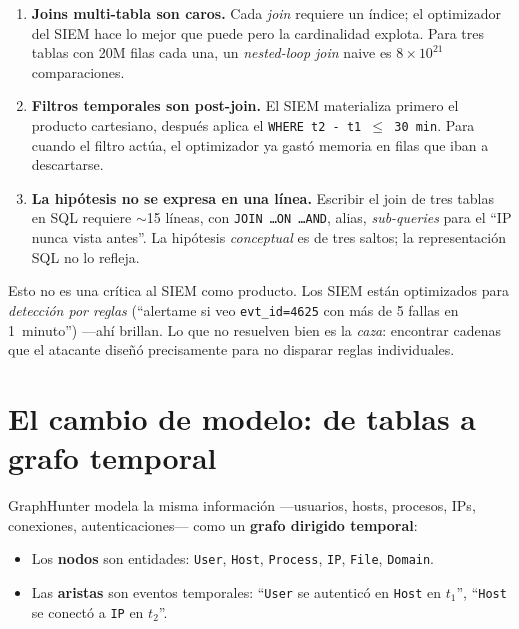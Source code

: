 \begin{enumerate}
    \item \textbf{Joins multi-tabla son caros.} Cada \emph{join}
    requiere un índice; el optimizador del SIEM hace lo mejor que
    puede pero la cardinalidad explota. Para tres tablas con 20M
    filas cada una, un \emph{nested-loop join} naive es \(8 \times
    10^{21}\) comparaciones.
    \item \textbf{Filtros temporales son post-join.} El SIEM
    materializa primero el producto cartesiano, después aplica el
    \texttt{WHERE t2 - t1 \(\leq\) 30~min}. Para cuando el filtro
    actúa, el optimizador ya gastó memoria en filas que iban a
    descartarse.
    \item \textbf{La hipótesis no se expresa en una línea.} Escribir
    el join de tres tablas en SQL requiere $\sim$15 líneas, con
    \texttt{JOIN \dots ON \dots AND}, alias, \emph{sub-queries} para
    el ``IP nunca vista antes''. La hipótesis \emph{conceptual} es de
    tres saltos; la representación SQL no lo refleja.
\end{enumerate}

\begin{nota}
Esto no es una crítica al SIEM como producto. Los SIEM están
optimizados para \emph{detección por reglas} (``alertame si veo
\texttt{evt\_id=4625} con más de 5 fallas en 1~minuto'') ---ahí
brillan. Lo que no resuelven bien es la \emph{caza}: encontrar
cadenas que el atacante diseñó precisamente para no disparar reglas
individuales.
\end{nota}

\section{El cambio de modelo: de tablas a grafo temporal}

GraphHunter modela la misma información ---usuarios, hosts, procesos,
IPs, conexiones, autenticaciones--- como un \textbf{grafo dirigido
temporal}:

\begin{itemize}
    \item Los \textbf{nodos} son entidades: \texttt{User},
    \texttt{Host}, \texttt{Process}, \texttt{IP},
    \texttt{File}, \texttt{Domain}.
    \item Las \textbf{aristas} son eventos temporales: ``\texttt{User}
    se autenticó en \texttt{Host} en \(t_1\)'',
    ``\texttt{Host} se conectó a \texttt{IP} en \(t_2\)''.
\end{itemize}


